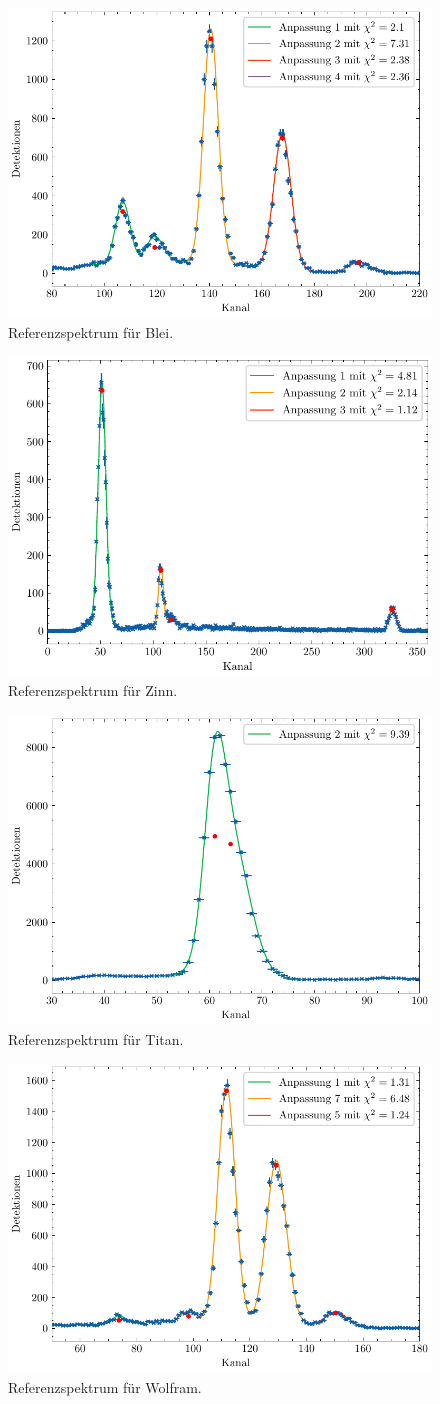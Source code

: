 \begin{figure}[H]
	\centering
	\includegraphics[width=0.6\linewidth]{../figs/Pb.pdf}
	\caption{Referenzspektrum für Blei.}
	\label{fig:pb}
\end{figure}
\begin{figure}[H]
	\centering
	\includegraphics[width=0.6\linewidth]{../figs/Sn.pdf}
	\caption{Referenzspektrum für Zinn.}
	\label{fig:sn}
\end{figure}
\begin{figure}[H]
	\centering
	\includegraphics[width=0.6\linewidth]{../figs/Titan.pdf}
	\caption{Referenzspektrum für Titan.}
	\label{fig:ti}
\end{figure}
\begin{figure}[H]
	\centering
	\includegraphics[width=0.6\linewidth]{../figs/W.pdf}
	\caption{Referenzspektrum für Wolfram.}
	\label{fig:w}
\end{figure}
